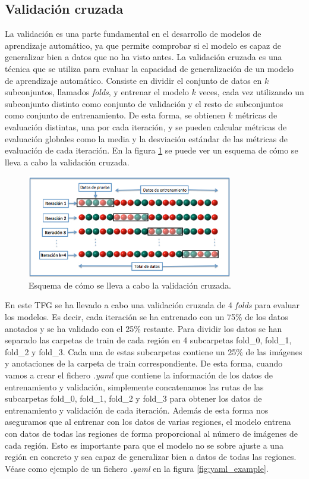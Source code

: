 \subsection{Validación cruzada}

La validación es una parte fundamental en el desarrollo de modelos de aprendizaje automático, ya que permite comprobar si el modelo es capaz de generalizar bien a datos que no ha visto antes. La validación cruzada es una técnica que se utiliza para evaluar la capacidad de generalización de un modelo de aprendizaje automático. Consiste en dividir el conjunto de datos en $k$ subconjuntos, llamados \textit{folds}, y entrenar el modelo $k$ veces, cada vez utilizando un subconjunto distinto como conjunto de validación y el resto de subconjuntos como conjunto de entrenamiento. De esta forma, se obtienen $k$ métricas de evaluación distintas, una por cada iteración, y se pueden calcular métricas de evaluación globales como la media y la desviación estándar de las métricas de evaluación de cada iteración. En la figura \ref{fig:cross_validation} se puede ver un esquema de cómo se lleva a cabo la validación cruzada.

\begin{figure}[H]
    \centering
    \includegraphics[width=0.8\textwidth]{img/K-fold_cross_validation.jpg}
    \caption{Esquema de cómo se lleva a cabo la validación cruzada. \cite{KFoldCV_image}}
    \label{fig:cross_validation}
\end{figure}

En este TFG se ha llevado a cabo una validación cruzada de 4 \textit{folds} para evaluar los modelos. Es decir, cada iteración se ha entrenado con un 75\% de los datos anotados y se ha validado con el 25\% restante. Para dividir los datos se han separado las carpetas de train de cada región en 4 subcarpetas fold\_0, fold\_1, fold\_2 y fold\_3. Cada una de estas subcarpetas contiene un 25\% de las imágenes y anotaciones de la carpeta de train correspondiente. De esta forma, cuando vamos a crear el fichero \textit{.yaml} que contiene la información de los datos de entrenamiento y validación, simplemente concatenamos las rutas de las subcarpetas fold\_0, fold\_1, fold\_2 y fold\_3 para obtener los datos de entrenamiento y validación de cada iteración. Además de esta forma nos aseguramos que al entrenar con los datos de varias regiones, el modelo entrena con datos de todas las regiones de forma proporcional al número de imágenes de cada región. Esto es importante para que el modelo no se sobre ajuste a una región en concreto y sea capaz de generalizar bien a datos de todas las regiones. Véase como ejemplo de un fichero \textit{.yaml} en la figura \ref{fig:yaml_example}.

